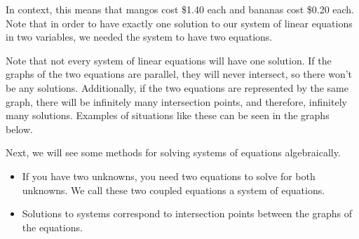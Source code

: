 \documentclass[nooutcomes]{ximera}
\begin{document}
In context, this means that mangos cost \$1.40 each and bananas cost \$0.20 each. Note that in order to have exactly one solution to our system of linear equations in two variables, we needed the system to have two equations.

Note that not every system of linear equations will have one solution. If the graphs of the two equations are parallel, they will never intersect, so there won't be any solutions. Additionally, if the two equations are represented by the same graph, there will be infinitely many intersection points, and therefore, infinitely many solutions. Examples of situations like these can be seen in the graphs below.

\begin{image}

\end{image}

Next, we will see some methods for solving systems of equations algebraically. 

\begin{summary}
	\begin{itemize}
		\item If you have two unknowns, you need two equations to solve for both unknowns. We call these two coupled equations a system of equations.
		\item Solutions to systems correspond to intersection points between the graphs of the equations. 
	\end{itemize}
\end{summary}
\end{document}
